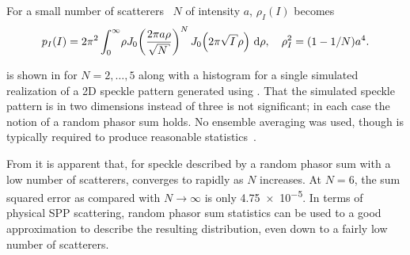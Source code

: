 For a small number of scatterers~\cite{jakeman1984speckle} $N$ of intensity
$a$, $\rho_I(I)$ becomes~\cite{goodman2007speckle}
\begin{equation}
p_I(I) = 2\pi^2 \int_0^\infty\! \rho J_0\!\left(\frac{2\pi a
\rho}{\sqrt{N}}\right)^N J_0\!\left(2\pi\sqrt{I}\rho\right)\md\rho,\quad \rho_I^2=(1-1/N)a^4.
\label{eqn:smallscatteqn}
\end{equation}

 is shown in  for
$N=2,\ldots,5$ along with a histogram for a single simulated realization of a
2D speckle pattern generated using .  That the
simulated speckle pattern is in two dimensions instead of three is not
significant; in each case the notion of a random phasor sum holds.  No ensemble
averaging was used, though is typically required to produce reasonable
statistics~\cite{goodman2007speckle}.  

From  it is apparent that, for speckle described by a
random phasor sum with a low number of scatterers,
 converges to  rapidly as $N$
increases.  At $N=6$, the sum squared error as compared with $N\to\infty$ is
only \num{4.75e-5}.  In terms of physical SPP scattering, random phasor sum
statistics can be used to a good approximation to describe the resulting
distribution, even down to a fairly low number of scatterers.

